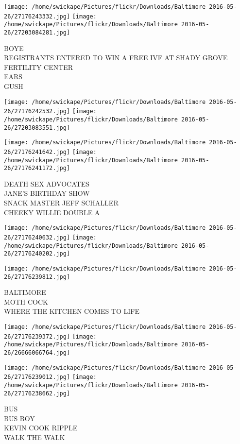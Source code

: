 \documentclass[10pt,letterpaper]{article}
\begin{document}
\texttt{[image: /home/swickape/Pictures/flickr/Downloads/Baltimore 2016-05-26/27176243332.jpg]}
\texttt{[image: /home/swickape/Pictures/flickr/Downloads/Baltimore 2016-05-26/27203084281.jpg]}

BOYE\\
REGISTRANTS ENTERED TO WIN A FREE IVF AT SHADY GROVE FERTILITY CENTER\\
EARS\\
GUSH
\pagebreak

\texttt{[image: /home/swickape/Pictures/flickr/Downloads/Baltimore 2016-05-26/27176242532.jpg]}
\texttt{[image: /home/swickape/Pictures/flickr/Downloads/Baltimore 2016-05-26/27203083551.jpg]}

\texttt{[image: /home/swickape/Pictures/flickr/Downloads/Baltimore 2016-05-26/27176241642.jpg]}
\texttt{[image: /home/swickape/Pictures/flickr/Downloads/Baltimore 2016-05-26/27176241172.jpg]}

DEATH SEX ADVOCATES\\
JANE'S BIRTHDAY SHOW\\
SNACK MASTER JEFF SCHALLER\\
CHEEKY WILLIE DOUBLE A
\pagebreak

\texttt{[image: /home/swickape/Pictures/flickr/Downloads/Baltimore 2016-05-26/27176240632.jpg]}
\texttt{[image: /home/swickape/Pictures/flickr/Downloads/Baltimore 2016-05-26/27176240202.jpg]}

\vspace{0.25in}
\texttt{[image: /home/swickape/Pictures/flickr/Downloads/Baltimore 2016-05-26/27176239812.jpg]}

BALTIMORE\\
MOTH COCK\\
WHERE THE KITCHEN COMES TO LIFE
\pagebreak

\texttt{[image: /home/swickape/Pictures/flickr/Downloads/Baltimore 2016-05-26/27176239372.jpg]}
\texttt{[image: /home/swickape/Pictures/flickr/Downloads/Baltimore 2016-05-26/26666066764.jpg]}

\texttt{[image: /home/swickape/Pictures/flickr/Downloads/Baltimore 2016-05-26/27176239012.jpg]}
\texttt{[image: /home/swickape/Pictures/flickr/Downloads/Baltimore 2016-05-26/27176238662.jpg]}

BUS\\
BUS BOY\\
KEVIN COOK RIPPLE\\
WALK THE WALK
\pagebreak
\end{document}
